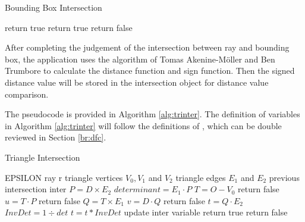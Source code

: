 \begin{algorithm}[H]
    \caption{Bounding Box Intersection}
    \label{alg:bboxinter}
    \begin{algorithmic}
        \State return true
        \State return true
        \Else
        \State return false
        \EndIf
    \end{algorithmic}
\end{algorithm}

After completing the judgement of the intersection between ray and bounding box, the application uses the algorithm of Tomas Akenine-M{\"o}ller and Ben Trumbore \cite{AkenineMller2005FastMS} to calculate the distance function and sign function. Then the signed distance value will be stored in the intersection object for distance value comparison.

\hspace*{\fill}

The pseudocode is provided in Algorithm \ref{alg:trinter}. The definition of variables in Algorithm \ref{alg:trinter} will follow the definitions of \cite{AkenineMller2005FastMS}, which can be double reviewed in Section \ref{br:dfc}.

\begin{breakablealgorithm}
    \caption{Triangle Intersection}
    \label{alg:trinter}
    \begin{algorithmic}
        \Require EPSILON    
        \State ray r  
        \State triangle vertices $ V_{0}, V_{1} $ and $ V_{2}$
        \State triangle edges $ E_{1} $ and $ E_{2} $
        \State previous intersection inter
        \Statex
        \State $ P = D\times E_{2} $
        \State $ determinant = E_{1} \cdot P $    
        \State $ T = O - V_{0} $
        \Statex
        \State return false
        \EndIf
        \Statex
        \State $ u = T \cdot P $
        \State return false
        \EndIf
        \Statex
        \State $ Q = T \times E_{1} $
        \State $ v = D \cdot Q $
        \Statex
        \State return false
        \EndIf
        \Statex
        \State $  t = Q \cdot E_{2} $
        \State $  InvDet = 1{\div} det $
        \State $  t = t * InvDet $
        \State update inter variable
        \State return true
        \Else \hspace{2pt} return false
        \EndIf
    \end{algorithmic}
\end{breakablealgorithm}

